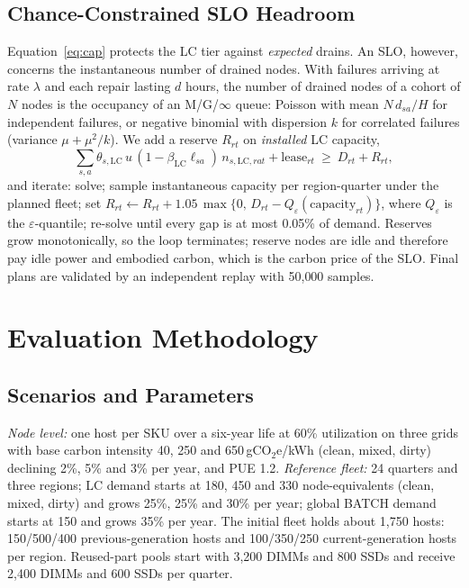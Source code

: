 \subsection{Chance-Constrained SLO Headroom}
Equation~\eqref{eq:cap} protects the LC tier against \emph{expected} drains. An SLO, however, concerns the instantaneous number of drained nodes. With failures arriving at rate $\lambda$ and each repair lasting $d$ hours, the number of drained nodes of a cohort of $N$ nodes is the occupancy of an M/G/$\infty$ queue: Poisson with mean $N\,d_{sa}/H$ for independent failures, or negative binomial with dispersion $k$ for correlated failures (variance $\mu+\mu^2/k$). We add a reserve $R_{rt}$ on \emph{installed} LC capacity,
\begin{equation}
\sum_{s,a}\theta_{s,\text{LC}}\,u\,(1-\beta_{\text{LC}}\ell_{sa})\,n_{s,\text{LC},rat}+\text{lease}_{rt}\ \ge\ D_{rt}+R_{rt},
\label{eq:reserve}
\end{equation}
and iterate: solve; sample instantaneous capacity per region-quarter under the planned fleet; set $R_{rt}\leftarrow R_{rt}+1.05\,\max\{0,\,D_{rt}-Q_\varepsilon(\text{capacity}_{rt})\}$, where $Q_\varepsilon$ is the $\varepsilon$-quantile; re-solve until every gap is at most 0.05\% of demand. Reserves grow monotonically, so the loop terminates; reserve nodes are idle and therefore pay idle power and embodied carbon, which is the carbon price of the SLO. Final plans are validated by an independent replay with 50{,}000 samples.

\section{Evaluation Methodology}
\label{sec:method}
\subsection{Scenarios and Parameters}
\emph{Node level:} one host per SKU over a six-year life at 60\% utilization on three grids with base carbon intensity 40, 250 and 650\,gCO$_2$e/kWh (clean, mixed, dirty) declining 2\%, 5\% and 3\% per year, and PUE 1.2. \emph{Reference fleet:} 24 quarters and three regions; LC demand starts at 180, 450 and 330 node-equivalents (clean, mixed, dirty) and grows 25\%, 25\% and 30\% per year; global BATCH demand starts at 150 and grows 35\% per year. The initial fleet holds about 1{,}750 hosts: 150/500/400 previous-generation hosts and 100/350/250 current-generation hosts per region. Reused-part pools start with 3{,}200 DIMMs and 800 SSDs and receive 2{,}400 DIMMs and 600 SSDs per quarter.

